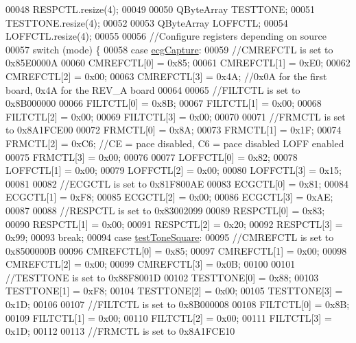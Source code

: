\begin{DoxyCode}
00048     RESPCTL.resize(4);
00049 
00050     QByteArray TESTTONE;
00051     TESTTONE.resize(4);
00052 
00053     QByteArray LOFFCTL;
00054     LOFFCTL.resize(4);
00055 
00056     \textcolor{comment}{//Configure registers depending on source}
00057     \textcolor{keywordflow}{switch} (mode) \{
00058     \textcolor{keywordflow}{case} \hyperlink{group__Device-Facade_ggabf6e5cc9109a573e29add762dc36df9ba9e4c8f425af52209ee3eb7c466852b22}{ecgCapture}:
00059         \textcolor{comment}{//CMREFCTL is set to 0x85E0000A}
00060         CMREFCTL[0] = 0x85;
00061         CMREFCTL[1] = 0xE0;
00062         CMREFCTL[2] = 0x00;
00063         CMREFCTL[3] = 0x4A; \textcolor{comment}{//0x0A for the first board, 0x4A for the REV\_A board}
00064 
00065         \textcolor{comment}{//FILTCTL is set to 0x8B000000}
00066         FILTCTL[0] = 0x8B;
00067         FILTCTL[1] = 0x00;
00068         FILTCTL[2] = 0x00;
00069         FILTCTL[3] = 0x00;
00070 
00071         \textcolor{comment}{//FRMCTL is set to 0x8A1FCE00}
00072         FRMCTL[0] = 0x8A;
00073         FRMCTL[1] = 0x1F;
00074         FRMCTL[2] = 0xC6; \textcolor{comment}{//CE = pace disabled, C6 = pace disabled LOFF enabled}
00075         FRMCTL[3] = 0x00;
00076 
00077         LOFFCTL[0] = 0x82;
00078         LOFFCTL[1] = 0x00;
00079         LOFFCTL[2] = 0x00;
00080         LOFFCTL[3] = 0x15;
00081 
00082         \textcolor{comment}{//ECGCTL is set to 0x81F800AE}
00083         ECGCTL[0] = 0x81;
00084         ECGCTL[1] = 0xF8;
00085         ECGCTL[2] = 0x00;
00086         ECGCTL[3] = 0xAE;
00087 
00088         \textcolor{comment}{//RESPCTL is set to 0x83002099}
00089         RESPCTL[0] = 0x83;
00090         RESPCTL[1] = 0x00;
00091         RESPCTL[2] = 0x20;
00092         RESPCTL[3] = 0x99;
00093         \textcolor{keywordflow}{break};
00094     \textcolor{keywordflow}{case} \hyperlink{group__Device-Facade_ggabf6e5cc9109a573e29add762dc36df9ba8b349f0786d8e8247f4bc381baa51134}{testToneSquare}:
00095         \textcolor{comment}{//CMREFCTL is set to 0x8500000B}
00096         CMREFCTL[0] = 0x85;
00097         CMREFCTL[1] = 0x00;
00098         CMREFCTL[2] = 0x00;
00099         CMREFCTL[3] = 0x0B;
00100 
00101         \textcolor{comment}{//TESTTONE is set to 0x88F8001D}
00102         TESTTONE[0] = 0x88;
00103         TESTTONE[1] = 0xF8;
00104         TESTTONE[2] = 0x00;
00105         TESTTONE[3] = 0x1D;
00106 
00107         \textcolor{comment}{//FILTCTL is set to 0x8B000008}
00108         FILTCTL[0] = 0x8B;
00109         FILTCTL[1] = 0x00;
00110         FILTCTL[2] = 0x00;
00111         FILTCTL[3] = 0x1D;
00112 
00113         \textcolor{comment}{//FRMCTL is set to 0x8A1FCE10}

\end{DoxyCode}
